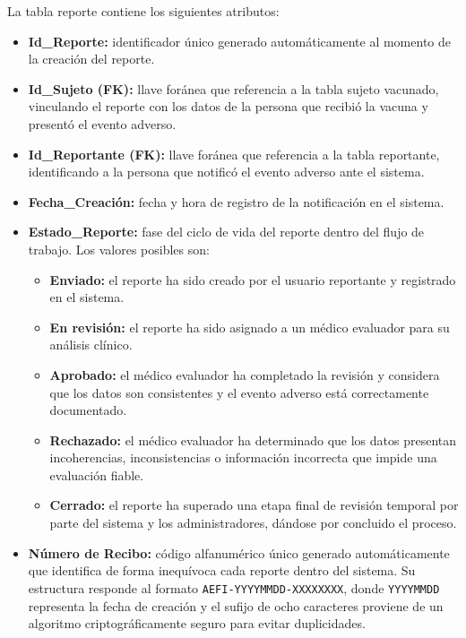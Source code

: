 La tabla reporte contiene los siguientes atributos:
\begin{itemize}
    \item \textbf{Id\_Reporte:} identificador único generado automáticamente al momento de la creación del reporte.
    \item \textbf{Id\_Sujeto (FK):} llave foránea que referencia a la tabla sujeto vacunado, vinculando el reporte con los datos de la persona que recibió la vacuna y presentó el evento adverso.
    \item \textbf{Id\_Reportante (FK):} llave foránea que referencia a la tabla reportante, identificando a la persona que notificó el evento adverso ante el sistema.
    \item \textbf{Fecha\_Creación:} fecha y hora de registro de la notificación en el sistema.
    \item \textbf{Estado\_Reporte:} fase del ciclo de vida del reporte dentro del flujo de trabajo. Los valores posibles son:
        \begin{itemize}
            \item \textbf{Enviado:} el reporte ha sido creado por el usuario reportante y registrado en el sistema.
            \item \textbf{En revisión:} el reporte ha sido asignado a un médico evaluador para su análisis clínico.
            \item \textbf{Aprobado:} el médico evaluador ha completado la revisión y considera que los datos son consistentes y el evento adverso está correctamente documentado.
            \item \textbf{Rechazado:} el médico evaluador ha determinado que los datos presentan incoherencias, inconsistencias o información incorrecta que impide una evaluación fiable.
            \item \textbf{Cerrado:} el reporte ha superado una etapa final de revisión temporal por parte del sistema y los administradores, dándose por concluido el proceso.
        \end{itemize}
    \item \textbf{Número de Recibo:} código alfanumérico único generado automáticamente que identifica de forma inequívoca cada reporte dentro del sistema. Su estructura responde al formato \texttt{AEFI-YYYYMMDD-XXXXXXXX}, donde \texttt{YYYYMMDD} representa la fecha de creación y el sufijo de ocho caracteres proviene de un algoritmo criptográficamente seguro para evitar duplicidades.
\end{itemize}

